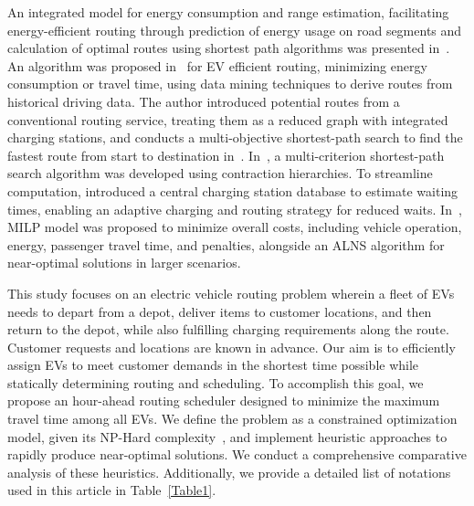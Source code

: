 \documentclass[conference]{IEEEtran}
\newcommand{\cmt}[1]{ }
\begin{document}
An integrated model for energy consumption and range estimation, facilitating energy-efficient routing through prediction of energy usage on road segments and calculation of optimal routes using shortest path algorithms was presented in~\cite{de2019model}. An algorithm  was proposed in~\cite{bozorgi2017time} for EV efficient routing, minimizing energy consumption or travel time, using data mining techniques to derive routes from historical driving data. The author introduced potential routes from a conventional routing service, treating them as a reduced graph with integrated charging stations, and conducts a multi-objective shortest-path search to find the fastest route from start to destination in~\cite{morlock2019time}. In~\cite{schoenberg2022reducing}, a multi-criterion shortest-path search algorithm was developed using contraction hierarchies. To streamline computation, introduced a central charging station database to estimate waiting times, enabling an adaptive charging and routing strategy for reduced waits. In~\cite{ma2023time}, MILP model was proposed to minimize overall costs, including vehicle operation, energy, passenger travel time, and penalties, alongside an ALNS algorithm for near-optimal solutions in larger scenarios. 

This study focuses on an electric vehicle routing problem wherein a fleet of EVs needs to depart from a depot, deliver items to customer locations, and then return to the depot, while also fulfilling  charging requirements along the route. Customer requests and locations are known in advance. Our aim is to efficiently assign EVs to meet customer demands in the shortest time possible while statically determining routing and scheduling. To accomplish this goal, we propose an hour-ahead routing scheduler designed to minimize the maximum travel time among all EVs. We define the problem as a constrained optimization model, given its NP-Hard complexity~\cite{erdelic2019survey}, and implement heuristic approaches to rapidly produce near-optimal solutions. We conduct a comprehensive comparative analysis of these heuristics. Additionally, we provide a detailed list of notations used in this article in Table~\ref{Table1}. 

\cmt{The outline for this paper is as follows. 
Section~\ref{sec:model} presents the system model and problem definition. Constraint optimization programming (COP) model and heuristic approaches are discussed in Section~\ref{sec:COP} and Section~\ref{sec:heuristic}, respectively.
In Section~\ref{sec:simulation}, results are discussed. 
Finally, in Section~\ref{sec:CF}, concludes the paper.}
\end{document}
